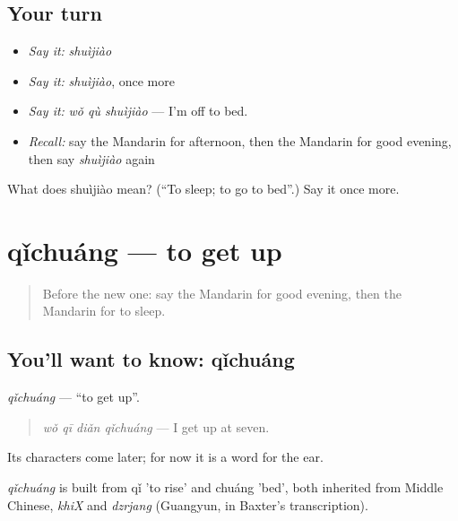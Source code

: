 \subsection*{Your turn}
\begin{itemize}
\raggedright
  \item \emph{Say it:} \emph{shuìjiào}
  \item \emph{Say it:} \emph{shuìjiào}, once more
  \item \emph{Say it:} \emph{wǒ qù shuìjiào} — I'm off to bed.
  \item \emph{Recall:} say the Mandarin for afternoon, then the Mandarin for good evening, then say \emph{shuìjiào} again
\end{itemize}

\begin{tcolorbox}[breakable,colback=teal!4,colframe=teal!35!black,title={Before you move on}]
What does shuìjiào mean? (\textquotedblleft{}To sleep; to go to bed\textquotedblright{}.) Say it once more.
\end{tcolorbox}
\section[qǐchuáng]{qǐchuáng — to get up}

\label{lesson:ZH-C50-qichuang}



\begin{quote}
Before the new one: say the Mandarin for good evening, then the Mandarin for to sleep.
\end{quote}

\subsection*{You'll want to know: qǐchuáng}
\emph{qǐchuáng} — \textquotedblleft{}to get up\textquotedblright{}.

\begin{quote}
\emph{wǒ qī diǎn qǐchuáng} — I get up at seven.
\end{quote}

Its characters come later; for now it is a word for the ear.

\begin{cousinweb}
\emph{qǐchuáng} is built from qǐ 'to rise' and chuáng 'bed', both inherited from Middle Chinese, \emph{khiX} and \emph{dzrjang} (Guangyun, in Baxter's transcription).
\end{cousinweb}

